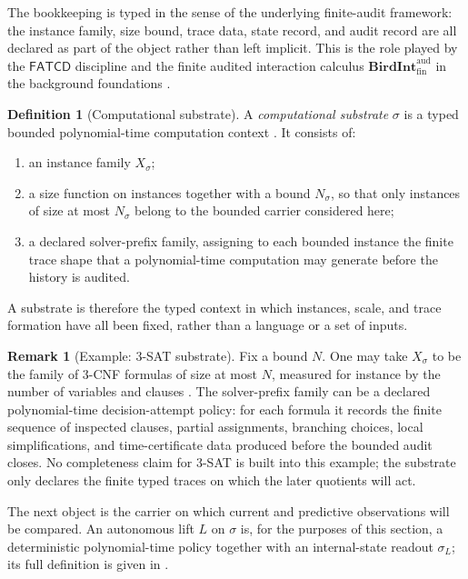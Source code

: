 \documentclass[11pt]{article}
\newcommand{\Substrate}{\sigma}             \newcommand{\Lift}{L}                       \newcommand{\LiftState}{\sigma_{L}}         \newcommand{\HistorySpace}{H_{\Substrate}^{\Lift}}
\newcommand{\FATCD}{\mathsf{FATCD}}
\newcommand{\BirdInt}{\mathbf{BirdInt}^{\mathrm{aud}}_{\mathrm{fin}}}
\theoremstyle{definition}
\newtheorem{definition}[theorem]{Definition}
\newtheorem{remark}[theorem]{Remark}
\begin{document}
The bookkeeping is typed in the sense of the underlying finite-audit
framework: the instance family, size bound, trace data, state record,
and audit record are all declared as part of the object rather than
left implicit.  This is the role played by the \(\FATCD\) discipline
and the finite audited interaction calculus \(\BirdInt\) in the
background foundations \citep{TsiokosFoundationsII2026,TsiokosFoundationsIII2026}.

\begin{definition}[Computational substrate]
\label{def:substrate}
A \emph{computational substrate} \(\Substrate\) is a typed bounded
polynomial-time computation context \citep{AroraBarak2009Complexity}.
It consists of:
\begin{enumerate}
  \item an instance family \(X_{\Substrate}\);
  \item a size function on instances together with a bound
  \(N_{\Substrate}\), so that only instances of size at most
  \(N_{\Substrate}\) belong to the bounded carrier considered here;
  \item a declared solver-prefix family, assigning to each bounded
  instance the finite trace shape that a polynomial-time computation
  may generate before the history is audited.
\end{enumerate}
A substrate is therefore the typed context in which instances, scale,
and trace formation have all been fixed, rather than a language or a
set of inputs.
\end{definition}

\begin{remark}[Example: 3-SAT substrate]
Fix a bound \(N\).  One may take \(X_{\Substrate}\) to be the family
of 3-CNF formulas of size at most \(N\), measured for instance by the
number of variables and clauses
\citep{Cook1971TheoremProving,Karp1972Reducibility,GareyJohnson1979Intractability}.  The solver-prefix family can be a
declared polynomial-time decision-attempt policy: for each formula it
records the finite sequence of inspected clauses, partial assignments,
branching choices, local simplifications, and time-certificate data
produced before the bounded audit closes.  No completeness claim for
3-SAT is built into this example; the substrate only declares the
finite typed traces on which the later quotients will act.
\end{remark}

The next object is the carrier on which current and predictive
observations will be compared.  An autonomous lift \(\Lift\) on
\(\Substrate\) is, for the purposes of this section, a deterministic
polynomial-time policy together with an internal-state readout
\(\LiftState\); its full definition is given in
.
\end{document}
